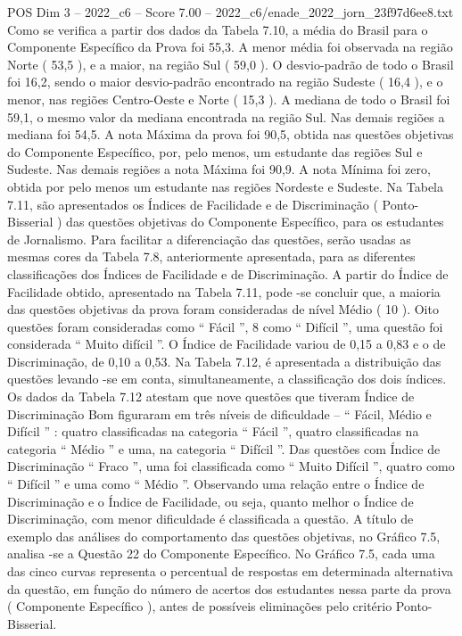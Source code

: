 \begin{textsample}{POS Dim 3 – 2022\_c6 – Score 7.00 – 2022\_c6/enade\_2022\_jorn\_23f97d6ee8.txt}
Como se verifica a partir dos dados da Tabela 7.10, a média do Brasil para o Componente Específico da Prova foi 55,3.
A menor média foi observada na região Norte ( 53,5 ), e a maior, na região Sul ( 59,0 ).
O desvio-padrão de todo o Brasil foi 16,2, sendo o maior desvio-padrão encontrado na região Sudeste ( 16,4 ), e o menor, nas regiões Centro-Oeste e Norte ( 15,3 ).
A mediana de todo o Brasil foi 59,1, o mesmo valor da mediana encontrada na região Sul.
Nas demais regiões a mediana foi 54,5.
A nota Máxima da prova foi 90,5, obtida nas questões objetivas do Componente Específico, por, pelo menos, um estudante das regiões Sul e Sudeste.
Nas demais regiões a nota Máxima foi 90,9.
A nota Mínima foi zero, obtida por pelo menos um estudante nas regiões Nordeste e Sudeste.
Na Tabela 7.11, são apresentados os Índices de Facilidade e de Discriminação ( Ponto-Bisserial ) das questões objetivas do Componente Específico, para os estudantes de Jornalismo.
Para facilitar a diferenciação das questões, serão usadas as mesmas cores da Tabela 7.8, anteriormente apresentada, para as diferentes classificações dos Índices de Facilidade e de Discriminação.
A partir do Índice de Facilidade obtido, apresentado na Tabela 7.11, pode -se concluir que, a maioria das questões objetivas da prova foram consideradas de nível Médio ( 10 ).
Oito questões foram consideradas como “ Fácil ”, 8 como “ Difícil ”, uma questão foi considerada “ Muito difícil ”.
O Índice de Facilidade variou de 0,15 a 0,83 e o de Discriminação, de 0,10 a 0,53.
Na Tabela 7.12, é apresentada a distribuição das questões levando -se em conta, simultaneamente, a classificação dos dois índices.
Os dados da Tabela 7.12 atestam que nove questões que tiveram Índice de Discriminação Bom figuraram em três níveis de dificuldade – “ Fácil, Médio e Difícil ” : quatro classificadas na categoria “ Fácil ”, quatro classificadas na categoria “ Médio ” e uma, na categoria “ Difícil ”.
Das questões com Índice de Discriminação “ Fraco ”, uma foi classificada como “ Muito Difícil ”, quatro como “ Difícil ” e uma como “ Médio ”.
Observando uma relação entre o Índice de Discriminação e o Índice de Facilidade, ou seja, quanto melhor o Índice de Discriminação, com menor dificuldade é classificada a questão.
A título de exemplo das análises do comportamento das questões objetivas, no Gráfico 7.5, analisa -se a Questão 22 do Componente Específico.
No Gráfico 7.5, cada uma das cinco curvas representa o percentual de respostas em determinada alternativa da questão, em função do número de acertos dos estudantes nessa parte da prova ( Componente Específico ), antes de possíveis eliminações pelo critério Ponto-Bisserial.

\end{textsample}
